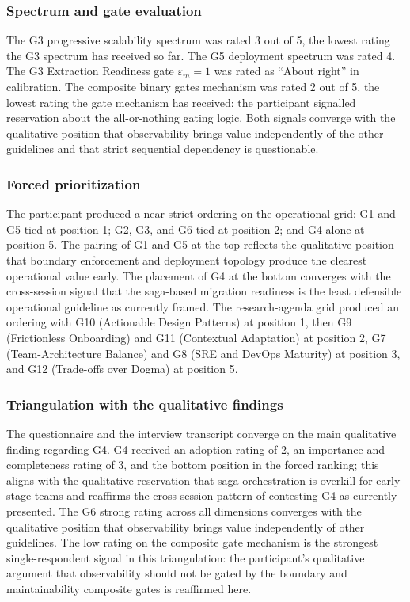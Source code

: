 \subsubsection*{Spectrum and gate evaluation}

The G3 progressive scalability spectrum was rated 3 out of 5, the lowest rating the G3 spectrum has received so far. The G5 deployment spectrum was rated 4. The G3 Extraction Readiness gate $\varepsilon_m = 1$ was rated as ``About right'' in calibration. The composite binary gates mechanism was rated 2 out of 5, the lowest rating the gate mechanism has received: the participant signalled reservation about the all-or-nothing gating logic. Both signals converge with the qualitative position that observability brings value independently of the other guidelines and that strict sequential dependency is questionable.

\subsubsection*{Forced prioritization}

The participant produced a near-strict ordering on the operational grid: G1 and G5 tied at position 1; G2, G3, and G6 tied at position 2; and G4 alone at position 5. The pairing of G1 and G5 at the top reflects the qualitative position that boundary enforcement and deployment topology produce the clearest operational value early. The placement of G4 at the bottom converges with the cross-session signal that the saga-based migration readiness is the least defensible operational guideline as currently framed. The research-agenda grid produced an ordering with G10 (Actionable Design Patterns) at position 1, then G9 (Frictionless Onboarding) and G11 (Contextual Adaptation) at position 2, G7 (Team-Architecture Balance) and G8 (SRE and DevOps Maturity) at position 3, and G12 (Trade-offs over Dogma) at position 5.

\subsubsection*{Triangulation with the qualitative findings}

The questionnaire and the interview transcript converge on the main qualitative finding regarding G4. G4 received an adoption rating of 2, an importance and completeness rating of 3, and the bottom position in the forced ranking; this aligns with the qualitative reservation that saga orchestration is overkill for early-stage teams and reaffirms the cross-session pattern of contesting G4 as currently presented. The G6 strong rating across all dimensions converges with the qualitative position that observability brings value independently of other guidelines. The low rating on the composite gate mechanism is the strongest single-respondent signal in this triangulation: the participant's qualitative argument that observability should not be gated by the boundary and maintainability composite gates is reaffirmed here.

